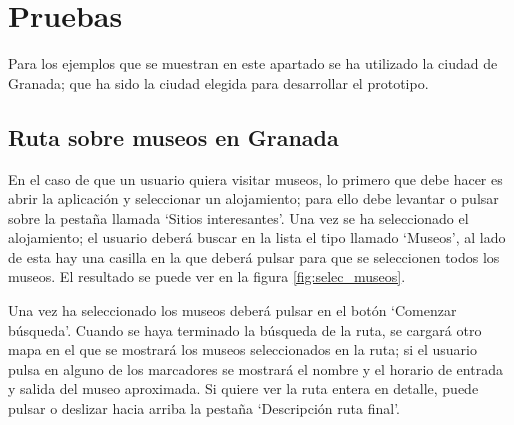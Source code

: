 \section{Pruebas}
Para los ejemplos que se muestran en este apartado se ha utilizado la ciudad de Granada; que ha sido la ciudad elegida para desarrollar el prototipo.

\subsection[Caso 1]{Ruta sobre museos en Granada}
En el caso de que un usuario quiera visitar museos, lo primero que debe hacer es abrir la aplicación y seleccionar un alojamiento; para ello debe levantar o pulsar sobre la pestaña llamada \enquote*{Sitios interesantes}. Una vez se ha seleccionado el alojamiento; el usuario deberá buscar en la lista el tipo llamado \enquote*{Museos}, al lado de esta hay una casilla en la que deberá pulsar para que se seleccionen todos los museos. El resultado se puede ver en la figura \ref{fig:selec_museos}.\newline

Una vez ha seleccionado los museos deberá pulsar en el botón \enquote*{Comenzar búsqueda}. Cuando se haya terminado la búsqueda de la ruta, se cargará otro mapa en el que se mostrará los museos seleccionados en la ruta; si el usuario pulsa en alguno de los marcadores se mostrará el nombre y el horario de entrada y salida del museo aproximada. Si quiere ver la ruta entera en detalle, puede pulsar o deslizar hacia arriba la pestaña \enquote*{Descripción ruta final}.\newline

